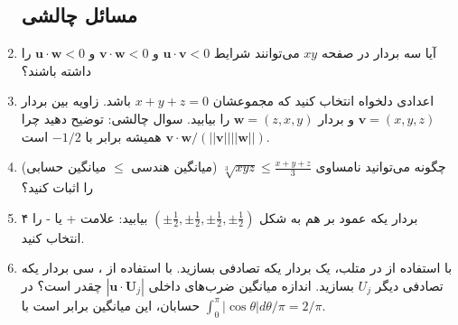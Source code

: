\documentclass[12pt, a4paper]{book}
\begin{document}
\begin{enumerate}
		\subsection*{مسائل چالشی}
		\item آیا سه بردار در صفحه $xy$ می‌توانند شرایط $\mathbf{u}\cdot\mathbf{v}<0$ و $\mathbf{v}\cdot\mathbf{w}<0$ و $\mathbf{u}\cdot\mathbf{w}<0$ را داشته باشند؟
		\item اعدادی دلخواه انتخاب کنید که مجموعشان $x+y+z=0$ باشد. زاویه بین بردار $\mathbf{v}=(x,y,z)$ و بردار $\mathbf{w}=(z,x,y)$ را بیابید. سوال چالشی: توضیح دهید چرا $\mathbf{v}\cdot\mathbf{w}/(||\mathbf{v}||||\mathbf{w}||)$ همیشه برابر با $-1/2$ است.
		\item چگونه می‌توانید نامساوی $\sqrt[3]{xyz} \le \frac{x+y+z}{3}$ (میانگین هندسی $\le$ میانگین حسابی) را اثبات کنید؟
		\item ۴ بردار یکه عمود بر هم به شکل $(\pm\frac{1}{2}, \pm\frac{1}{2}, \pm\frac{1}{2}, \pm\frac{1}{2})$ بیابید: علامت + یا - را انتخاب کنید.
		\item با استفاده از  در متلب، یک بردار یکه تصادفی  بسازید. با استفاده از ، سی بردار یکه تصادفی دیگر $U_j$ بسازید. اندازه میانگین ضرب‌های داخلی $|\mathbf{u}\cdot\mathbf{U}_j|$ چقدر است؟ در حسابان، این میانگین برابر است با $\int_0^\pi |\cos\theta|d\theta / \pi = 2/\pi$.
	\end{enumerate}
	
\end{document}
